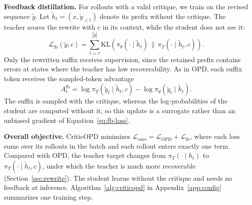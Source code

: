 \noindent\textbf{Feedback distillation.}
For rollouts with a valid critique, we train on the revised sequence $\tilde{y}$. Let $\tilde{h}_t=(x,\tilde{y}_{<t})$ denote its prefix without the critique. The teacher scores the rewrite with $c$ in its context, while the student does not see it:
\begin{equation}
\mathcal{L}_{\mathrm{fb}}(\tilde{y};c)
=
\sum_{t=\tau}^{|\tilde{y}|}
\mathrm{KL}\left(
\pi_\theta(\cdot\mid\tilde{h}_t)
\,\big\|\,
\pi_T(\cdot\mid\tilde{h}_t,c)
\right).
\label{eq:fb-loss}
\end{equation}
Only the rewritten suffix receives supervision, since the retained prefix contains errors at states where the teacher has low recoverability. As in OPD, each suffix token receives the sampled-token advantage
\begin{equation}
A_t^{\mathrm{fb}}
=
\log\pi_T(\tilde{y}_t\mid\tilde{h}_t,c)-\log\pi_\theta(\tilde{y}_t\mid\tilde{h}_t).
\label{eq:fb}
\end{equation}
The suffix is sampled with the critique, whereas the log-probabilities of the student are computed without it, so this update is a surrogate rather than an unbiased gradient of Equation~\eqref{eq:fb-loss}.

\noindent\textbf{Overall objective.}
CriticOPD minimizes $\mathcal{L}_{\mathrm{ours}}=\mathcal{L}_{\mathrm{OPD}}+\mathcal{L}_{\mathrm{fb}}$, where each loss sums over its rollouts in the batch and each rollout enters exactly one term. Compared with OPD, the teacher target changes from $\pi_T(\cdot\mid h_t)$ to $\pi_T(\cdot\mid\tilde{h}_t,c)$, under which the teacher is much more recoverable (Section~\ref{sec:rewrite}). The student learns without the critique and needs no feedback at inference. Algorithm~\ref{alg:criticopd} in Appendix~\ref{app:config} summarizes one training step.
